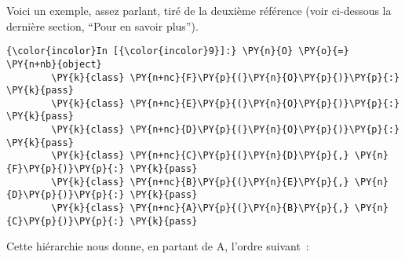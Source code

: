     Voici un exemple, assez parlant, tiré de la deuxième référence (voir
ci-dessous la dernière section, ``Pour en savoir plus'').

    \begin{Verbatim}[commandchars=\\\{\},frame=single,framerule=0.3mm,rulecolor=\color{cellframecolor}]
{\color{incolor}In [{\color{incolor}9}]:} \PY{n}{O} \PY{o}{=} \PY{n+nb}{object}
        \PY{k}{class} \PY{n+nc}{F}\PY{p}{(}\PY{n}{O}\PY{p}{)}\PY{p}{:} \PY{k}{pass}
        \PY{k}{class} \PY{n+nc}{E}\PY{p}{(}\PY{n}{O}\PY{p}{)}\PY{p}{:} \PY{k}{pass}
        \PY{k}{class} \PY{n+nc}{D}\PY{p}{(}\PY{n}{O}\PY{p}{)}\PY{p}{:} \PY{k}{pass}
        \PY{k}{class} \PY{n+nc}{C}\PY{p}{(}\PY{n}{D}\PY{p}{,} \PY{n}{F}\PY{p}{)}\PY{p}{:} \PY{k}{pass}
        \PY{k}{class} \PY{n+nc}{B}\PY{p}{(}\PY{n}{E}\PY{p}{,} \PY{n}{D}\PY{p}{)}\PY{p}{:} \PY{k}{pass}
        \PY{k}{class} \PY{n+nc}{A}\PY{p}{(}\PY{n}{B}\PY{p}{,} \PY{n}{C}\PY{p}{)}\PY{p}{:} \PY{k}{pass}
\end{Verbatim}


    Cette hiérarchie nous donne, en partant de A, l'ordre suivant~:

